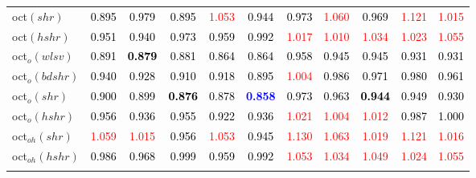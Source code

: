 \begin{tabular}[t]{l|>{}cccc>{}c|ccccc}
oct$(shr)$ & \textcolor{black}{0.895} & \textcolor{black}{0.979} & \textcolor{black}{0.895} & \textcolor{red}{1.053} & \textcolor{black}{0.944} & \textcolor{black}{0.973} & \textcolor{red}{1.060} & \textcolor{black}{0.969} & \textcolor{red}{1.121} & \textcolor{red}{1.015}\\
oct$(hshr)$ & \textcolor{black}{0.951} & \textcolor{black}{0.940} & \textcolor{black}{0.973} & \textcolor{black}{0.959} & \textcolor{black}{0.992} & \textcolor{red}{1.017} & \textcolor{red}{1.010} & \textcolor{red}{1.034} & \textcolor{red}{1.023} & \textcolor{red}{1.055}\\
oct$_o(wlsv)$ & \textcolor{black}{0.891} & \textcolor{black}{\textbf{0.879}} & \textcolor{black}{0.881} & \textcolor{black}{0.864} & \textcolor{black}{0.864} & \textcolor{black}{0.958} & \textcolor{black}{0.945} & \textcolor{black}{0.945} & \textcolor{black}{0.931} & \textcolor{black}{0.931}\\
oct$_o(bdshr)$ & \textcolor{black}{0.940} & \textcolor{black}{0.928} & \textcolor{black}{0.910} & \textcolor{black}{0.918} & \textcolor{black}{0.895} & \textcolor{red}{1.004} & \textcolor{black}{0.986} & \textcolor{black}{0.971} & \textcolor{black}{0.980} & \textcolor{black}{0.961}\\
oct$_o(shr)$ & \textcolor{black}{0.900} & \textcolor{black}{0.899} & \textcolor{black}{\textbf{0.876}} & \textcolor{black}{0.878} & \textcolor{blue}{\textbf{0.858}} & \textcolor{black}{0.973} & \textcolor{black}{0.963} & \textcolor{black}{\textbf{0.944}} & \textcolor{black}{0.949} & \textcolor{black}{0.930}\\
oct$_o(hshr)$ & \textcolor{black}{0.956} & \textcolor{black}{0.936} & \textcolor{black}{0.955} & \textcolor{black}{0.922} & \textcolor{black}{0.936} & \textcolor{red}{1.021} & \textcolor{red}{1.004} & \textcolor{red}{1.012} & \textcolor{black}{0.987} & \textcolor{black}{1.000}\\
oct$_{oh}(shr)$ & \textcolor{red}{1.059} & \textcolor{red}{1.015} & \textcolor{black}{0.956} & \textcolor{red}{1.053} & \textcolor{black}{0.945} & \textcolor{red}{1.130} & \textcolor{red}{1.063} & \textcolor{red}{1.019} & \textcolor{red}{1.121} & \textcolor{red}{1.016}\\
oct$_{oh}(hshr)$ & \textcolor{black}{0.986} & \textcolor{black}{0.968} & \textcolor{black}{0.999} & \textcolor{black}{0.959} & \textcolor{black}{0.992} & \textcolor{red}{1.053} & \textcolor{red}{1.034} & \textcolor{red}{1.049} & \textcolor{red}{1.024} & \textcolor{red}{1.055}\\
\addlinespace[0.3em]

\end{tabular}
